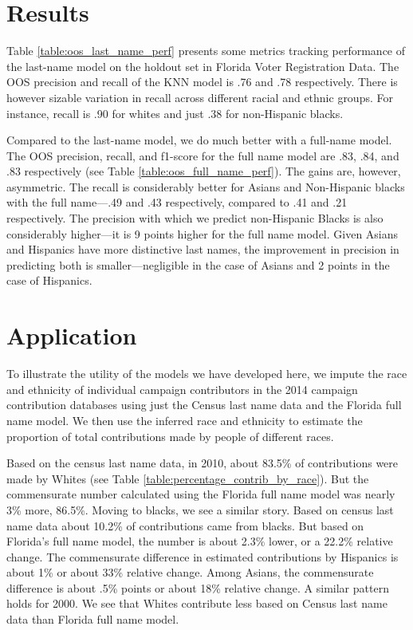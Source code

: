 \documentclass[12pt, letterpaper]{article}
\begin{document}
\section*{Results}

Table \ref{table:oos_last_name_perf} presents some metrics tracking performance of the last-name model on the holdout set in Florida Voter Registration Data. The OOS precision and recall of the KNN model is .76 and .78 respectively. There is however sizable variation in recall across different racial and ethnic groups. For instance, recall is .90 for whites and just .38 for non-Hispanic blacks. 



Compared to the last-name model, we do much better with a full-name model. The OOS precision, recall, and f1-score for the full name model are .83, .84, and .83 respectively (see Table \ref{table:oos_full_name_perf}). The gains are, however, asymmetric. The recall is considerably better for Asians and Non-Hispanic blacks with the full name---.49 and .43 respectively, compared to .41 and .21 respectively. The precision with which we predict non-Hispanic Blacks is also considerably higher---it is 9 points higher for the full name model. Given Asians and Hispanics have more distinctive last names, the improvement in precision in predicting both is smaller---negligible in the case of Asians and 2 points in the case of Hispanics.




\section*{Application}
To illustrate the utility of the models we have developed here, we impute the race and ethnicity of individual campaign contributors in the 2014 campaign contribution databases \citep{bonica2017database} using just the Census last name data and the Florida full name model. We then use the inferred race and ethnicity to estimate the proportion of total contributions made by people of different races. 

Based on the census last name data, in 2010, about 83.5\% of contributions were made by Whites (see Table \ref{table:percentage_contrib_by_race}). But the commensurate number calculated using the Florida full name model was nearly 3\% more, 86.5\%. Moving to blacks, we see a similar story. Based on census last name data about 10.2\% of contributions came from blacks. But based on Florida's full name model, the number is about 2.3\% lower, or a 22.2\% relative change. The commensurate difference in estimated contributions by Hispanics is about 1\% or about 33\% relative change. Among Asians, the commensurate difference is about .5\% points or about 18\% relative change. A similar pattern holds for 2000. We see that Whites contribute less based on Census last name data than Florida full name model.
\end{document}
